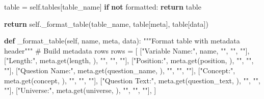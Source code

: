 \documentclass[
  11pt,
  a4paper,
]{article}
\newenvironment{Shaded}{\begin{snugshade}}{\end{snugshade}}
\newcommand{\CommentTok}[1]{\textcolor[rgb]{0.37,0.37,0.37}{#1}}
\newcommand{\ControlFlowTok}[1]{\textcolor[rgb]{0.00,0.23,0.31}{\textbf{#1}}}
\newcommand{\KeywordTok}[1]{\textcolor[rgb]{0.00,0.23,0.31}{\textbf{#1}}}
\newcommand{\NormalTok}[1]{\textcolor[rgb]{0.00,0.23,0.31}{#1}}
\newcommand{\OperatorTok}[1]{\textcolor[rgb]{0.37,0.37,0.37}{#1}}
\newcommand{\StringTok}[1]{\textcolor[rgb]{0.13,0.47,0.30}{#1}}
\newcommand{\VariableTok}[1]{\textcolor[rgb]{0.07,0.07,0.07}{#1}}
\begin{document}
\begin{Shaded}
\begin{Highlighting}[]
\NormalTok{        table }\OperatorTok{=} \VariableTok{self}\NormalTok{.tables[table\_name]}
        \ControlFlowTok{if} \KeywordTok{not}\NormalTok{ formatted:}
            \ControlFlowTok{return}\NormalTok{ table}
        
        \ControlFlowTok{return} \VariableTok{self}\NormalTok{.\_format\_table(table\_name, table[}\StringTok{\textquotesingle{}meta\textquotesingle{}}\NormalTok{], table[}\StringTok{\textquotesingle{}data\textquotesingle{}}\NormalTok{])}
    
    \KeywordTok{def}\NormalTok{ \_format\_table(}\VariableTok{self}\NormalTok{, name, meta, data):}
        \CommentTok{"""Format table with metadata header"""}
        \CommentTok{\# Build metadata rows}
\NormalTok{        rows }\OperatorTok{=}\NormalTok{ [}
\NormalTok{            [}\StringTok{"Variable Name:"}\NormalTok{, name, }\StringTok{""}\NormalTok{, }\StringTok{""}\NormalTok{, }\StringTok{""}\NormalTok{],}
\NormalTok{            [}\StringTok{"Length:"}\NormalTok{, meta.get(}\StringTok{\textquotesingle{}length\textquotesingle{}}\NormalTok{, }\StringTok{\textquotesingle{}\textquotesingle{}}\NormalTok{), }\StringTok{""}\NormalTok{, }\StringTok{""}\NormalTok{, }\StringTok{""}\NormalTok{],}
\NormalTok{            [}\StringTok{"Position:"}\NormalTok{, meta.get(}\StringTok{\textquotesingle{}position\textquotesingle{}}\NormalTok{, }\StringTok{\textquotesingle{}\textquotesingle{}}\NormalTok{), }\StringTok{""}\NormalTok{, }\StringTok{""}\NormalTok{, }\StringTok{""}\NormalTok{],}
\NormalTok{            [}\StringTok{"Question Name:"}\NormalTok{, meta.get(}\StringTok{\textquotesingle{}question\_name\textquotesingle{}}\NormalTok{, }\StringTok{\textquotesingle{}\textquotesingle{}}\NormalTok{), }\StringTok{""}\NormalTok{, }\StringTok{""}\NormalTok{, }\StringTok{""}\NormalTok{],}
\NormalTok{            [}\StringTok{"Concept:"}\NormalTok{, meta.get(}\StringTok{\textquotesingle{}concept\textquotesingle{}}\NormalTok{, }\StringTok{\textquotesingle{}\textquotesingle{}}\NormalTok{), }\StringTok{""}\NormalTok{, }\StringTok{""}\NormalTok{, }\StringTok{""}\NormalTok{],}
\NormalTok{            [}\StringTok{"Question Text:"}\NormalTok{, meta.get(}\StringTok{\textquotesingle{}question\_text\textquotesingle{}}\NormalTok{, }\StringTok{\textquotesingle{}\textquotesingle{}}\NormalTok{), }\StringTok{""}\NormalTok{, }\StringTok{""}\NormalTok{, }\StringTok{""}\NormalTok{],}
\NormalTok{            [}\StringTok{"Universe:"}\NormalTok{, meta.get(}\StringTok{\textquotesingle{}universe\textquotesingle{}}\NormalTok{, }\StringTok{\textquotesingle{}\textquotesingle{}}\NormalTok{), }\StringTok{""}\NormalTok{, }\StringTok{""}\NormalTok{, }\StringTok{""}\NormalTok{],}
\NormalTok{        ]}
        

\end{Highlighting}
\end{Shaded}
\end{document}
